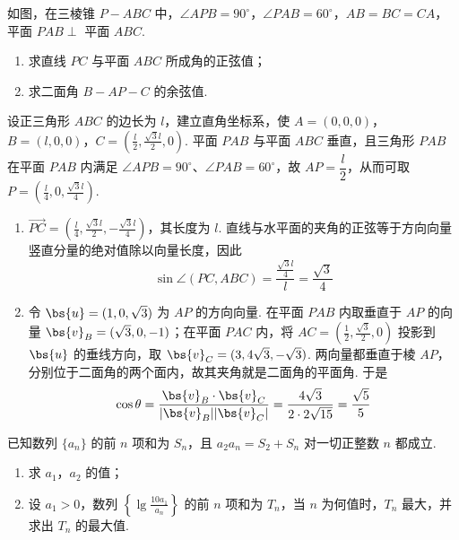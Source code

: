 \begin{problem}
如图，在三棱锥 \(P - ABC\) 中，\(\angle APB = 90^{\circ}\)，\(\angle PAB = 60^{\circ}\)，\(AB = BC = CA\)，平面 \(PAB \perp\) 平面 \(ABC\).
\begin{enumerate}
\item 求直线 \(PC\) 与平面 \(ABC\) 所成角的正弦值；
\item 求二面角 \(B - AP - C\) 的余弦值.
\end{enumerate}

\end{problem}

\begin{solution}
设正三角形 \(ABC\) 的边长为 \(l\)，建立直角坐标系，使
\(A=(0,0,0)\)，\(B=(l,0,0)\)，\(C=\left(\frac l2,\frac{\sqrt3l}{2},0\right)\).
平面 \(PAB\) 与平面 \(ABC\) 垂直，且三角形 \(PAB\) 在平面 \(PAB\) 内满足 \(\angle APB=90^{\circ}\)、\(\angle PAB=60^{\circ}\)，故
\(AP=\dfrac l2\)，从而可取 \(P=(\frac l4,0,\frac{\sqrt3l}{4})\).

\begin{enumerate}
\item \(\overrightarrow{PC}=\left(\frac l4,\frac{\sqrt3l}{2},-\frac{\sqrt3l}{4}\right)\)，其长度为 \(l\). 直线与水平面的夹角的正弦等于方向向量竖直分量的绝对值除以向量长度，因此
\[
\sin\angle(PC,ABC)=\frac{\frac{\sqrt3l}{4}}{l}=\frac{\sqrt3}{4}
\]
\item 令 \(\bs{u}=(1,0,\sqrt3)\) 为 \(AP\) 的方向向量. 在平面 \(PAB\) 内取垂直于 \(AP\) 的向量 \(\bs{v}_B=(\sqrt3,0,-1)\)；在平面 \(PAC\) 内，将 \(AC=(\frac12,\frac{\sqrt3}{2},0)\) 投影到 \(\bs{u}\) 的垂线方向，取
\(\bs{v}_C=(3,4\sqrt3,-\sqrt3)\). 两向量都垂直于棱 \(AP\)，分别位于二面角的两个面内，故其夹角就是二面角的平面角. 于是
\[
\cos\theta=\frac{\bs{v}_B\cdot\bs{v}_C}{|\bs{v}_B||\bs{v}_C|}
 =\frac{4\sqrt3}{2\cdot2\sqrt{15}}=\frac{\sqrt5}{5}
\]
\end{enumerate}
\end{solution}

\begin{problem}
已知数列 \(\{a_{n}\}\) 的前 \(n\) 项和为 \(S_{n}\)，且 \(a_{2}a_{n} = S_{2} + S_{n}\) 对一切正整数 \(n\) 都成立.
\begin{enumerate}
\item 求 \(a_{1}\)，\(a_{2}\) 的值；
\item 设 \(a_{1} > 0\)，数列 \(\left\{\lg \frac{10a_{1}}{a_{n}}\right\}\) 的前 \(n\) 项和为 \(T_{n}\)，当 \(n\) 为何值时，\(T_{n}\) 最大，并求出 \(T_{n}\) 的最大值.
\end{enumerate}
\end{problem}

